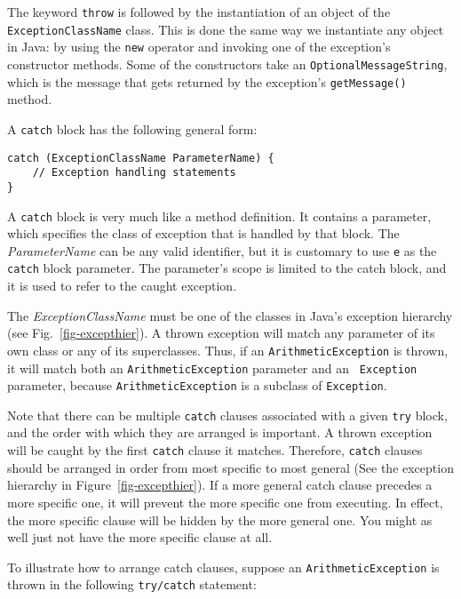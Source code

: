 \noindent The keyword {\tt throw} is followed by the instantiation
of an object of the {\tt ExceptionClassName} class.   This is done the
same way we instantiate any object in Java: by using the {\tt new}
operator and invoking one of the exception's constructor methods.  Some
of the constructors take an {\tt OptionalMes\-sage\-String}, which is the
message that gets returned by the exception's {\tt getMessage()}
method.

A {\tt catch} block has the following general form:

\begin{jjjlisting}
\begin{lstlisting}
catch (ExceptionClassName ParameterName) {
    // Exception handling statements
}
\end{lstlisting}
\end{jjjlisting}

\noindent A {\tt catch} block is very much like a method definition.
It contains a parameter, which specifies the class of exception that
is handled by that block.  The {\it ParameterName} can be any valid
identifier, but it is customary to use {\tt e} as the {\tt catch}
block parameter.  The parameter's scope is limited to the catch block,
and it is used to refer to the caught exception.

The {\it ExceptionClassName} must be one of the classes in Java's
exception hierarchy (see Fig.~\ref{fig-excepthier}).  A thrown
exception will match any parameter of its own class or any of its
superclasses.  Thus, if an {\tt ArithmeticEx\-cep\-tion} is thrown,
it will match both an {\tt ArithmeticException} parameter and an {\tt
Exception} parameter, because {\tt ArithmeticException} is a subclass
of {\tt Exception}.

Note that there can be multiple {\tt catch} clauses associated with a
given {\tt try} block, and the order with which they are arranged is
important. A thrown exception will be caught by the first {\tt catch}
clause it matches.  Therefore, {\tt catch} clauses
 should be arranged in order
from most specific to most general (See the exception hierarchy in
Figure~\ref{fig-excepthier}).  If a more general catch clause precedes a
more specific one, it will prevent the more specific one from
executing.  In effect, the more specific clause will be hidden by the
more general one.  You might as well just not have the more specific
clause at all.

To illustrate how to arrange catch clauses, suppose an
{\tt Arithmetic\-Exception} is thrown in the following {\tt try/catch}
statement:


